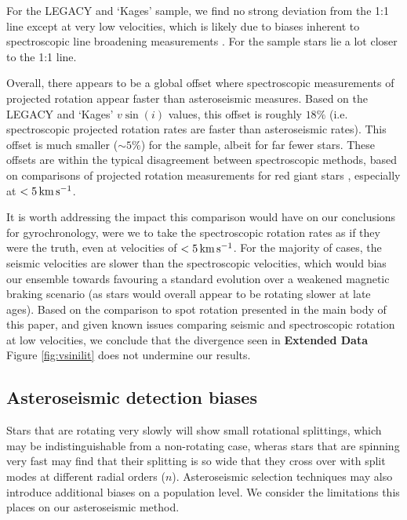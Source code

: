 For the LEGACY and `Kages' sample, we find no strong deviation from the 1:1 line except at very low velocities, which is likely due to biases inherent to spectroscopic line broadening measurements \cite{doyle+2014, tayar+2015}. For the \cite{benomar+2015} sample stars lie a lot closer to the 1:1 line.

Overall, there appears to be a global offset where spectroscopic measurements of projected rotation appear faster than asteroseismic measures. Based on the LEGACY and `Kages' $v\sin(i)$ values, this offset is roughly $18\%$ (i.e. spectroscopic projected rotation rates are faster than asteroseismic rates). This offset is much smaller ($\sim5\%$) for the \cite{benomar+2015} sample, albeit for far fewer stars. These offsets are within the typical disagreement between spectroscopic methods, based on comparisons of projected rotation measurements for red giant stars \cite[see Figure 2]{tayar+2015}, especially at $< 5\, \rm{km\,s^{-1}}$.

It is worth addressing the impact this comparison would have on our conclusions for gyrochronology, were we to take the spectroscopic rotation rates as if they were the truth, even at velocities of $< 5\, \rm{km\,s^{-1}}$. For the majority of cases, the seismic velocities are slower than the spectroscopic velocities, which would bias our ensemble towards favouring a standard evolution over a weakened magnetic braking scenario (as stars would overall appear to be rotating slower at late ages). Based on the comparison to spot rotation presented in the main body of this paper, and given known issues comparing seismic and spectroscopic rotation at low velocities, we conclude that the divergence seen in  \textbf{Extended Data} Figure \ref{fig:vsinilit} does not undermine our results.

\subsection{Asteroseismic detection biases}

Stars that are rotating very slowly will show small rotational splittings, which may be indistinguishable from a non-rotating case, wheras stars that are spinning very fast may find that their splitting is so wide that they cross over with split modes at different radial orders ($n$). Asteroseismic selection techniques may also introduce additional biases on a population level. We consider the limitations this places on our asteroseismic method.

